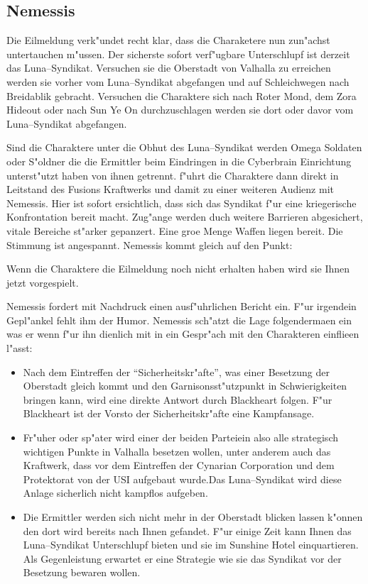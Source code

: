 \subsection{Nemessis} 
Die Eilmeldung verk"undet recht klar, dass die Charaketere nun zun"achst untertauchen m"ussen. Der sicherste sofort verf"ugbare Unterschlupf ist derzeit das Luna--Syndikat. Versuchen sie die Oberstadt von Valhalla zu erreichen werden sie vorher vom Luna--Syndikat abgefangen und auf Schleichwegen nach Breidablik gebracht. Versuchen die Charaktere sich nach Roter Mond, dem Zora Hideout oder nach Sun Ye On durchzuschlagen werden sie dort oder davor vom Luna--Syndikat abgefangen.

Sind die Charaktere unter die Obhut des Luna--Syndikat werden Omega Soldaten oder S"oldner die die Ermittler beim Eindringen in die Cyberbrain Einrichtung unterst"utzt haben von ihnen getrennt. \xl{} f"uhrt die Charaktere dann direkt in Leitstand des Fusions Kraftwerks und damit zu einer weiteren Audienz mit Nemessis. Hier ist sofort ersichtlich, dass sich das Syndikat f"ur eine kriegerische Konfrontation bereit macht. Zug"ange werden duch weitere Barrieren abgesichert, vitale Bereiche st"arker gepanzert. Eine gro\3e Menge Waffen liegen bereit. Die Stimmung ist angespannt. Nemessis kommt gleich auf den Punkt: 


Wenn die Charaktere die Eilmeldung noch nicht erhalten haben wird sie Ihnen jetzt vorgespielt.


Nemessis fordert mit Nachdruck einen ausf"uhrlichen Bericht ein. F"ur irgendein Gepl"ankel fehlt ihm der Humor. Nemessis sch"atzt die Lage folgenderma\3en ein was er wenn f"ur ihn dienlich mit in ein Gespr"ach mit den Charakteren einflie\3en l"asst:

\begin{itemize}
	\item Nach dem Eintreffen der "`Sicherheitskr"afte"', was einer Besetzung der Oberstadt gleich kommt und den 			
		Garnisonsst"utzpunkt in Schwierigkeiten bringen kann, wird eine direkte Antwort durch Blackheart folgen. F"ur Blackheart ist der Vorsto\3 der Sicherheitskr"afte eine Kampfansage.
	\item Fr"uher oder sp"ater wird einer der beiden Parteiein also alle strategisch wichtigen Punkte in Valhalla besetzen wollen, unter 	
		anderem auch das Kraftwerk, dass vor dem Eintreffen der Cynarian Corporation und dem Protektorat von der USI aufgebaut wurde.Das Luna--Syndikat wird diese Anlage sicherlich nicht kampflos aufgeben.
		\item Die Ermittler werden sich nicht mehr in der Oberstadt blicken lassen k"onnen den dort wird bereits nach Ihnen gefandet. F"ur 
		einige Zeit kann Ihnen das Luna--Syndikat Unterschlupf bieten und sie im Sunshine Hotel einquartieren. Als Gegenleistung erwartet er eine Strategie wie sie das Syndikat vor der Besetzung bewaren wollen.			
\end{itemize}

